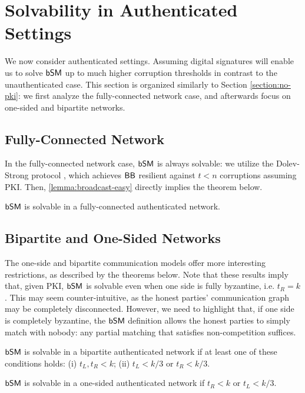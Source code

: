 \section{Solvability in Authenticated Settings}


We now consider authenticated settings. Assuming digital signatures will enable us to solve $\textsf{bSM}$ up to much higher corruption thresholds in contrast to the unauthenticated case. This section is organized similarly to Section \ref{section:no-pki}: we first analyze the fully-connected network case, and afterwards focus on one-sided and bipartite networks.

\subsection{Fully-Connected Network} 
In the fully-connected network case, $\textsf{bSM}$ is always solvable: we utilize the Dolev-Strong protocol \cite{DolStr83}, which achieves $\textsf{BB}$ resilient against $t < n$ corruptions assuming PKI. Then, \cref{lemma:broadcast-easy} directly implies the theorem below.
\begin{theorem}\label{theo:with-pki-complete}
$\textsf{bSM}$ is solvable in a fully-connected authenticated network.
\end{theorem}

\subsection{Bipartite and One-Sided Networks}\label{subsection:bipartite-pki}
The one-side and bipartite communication models offer more interesting restrictions, as described by the theorems below. 
Note that these results imply that, given PKI, $\textsf{bSM}$ is solvable even when one side is fully byzantine, i.e. $t_R = k$. This may seem counter-intuitive, as the honest parties' communication graph may be completely disconnected. However, we need to highlight that, if one side is completely byzantine, the $\textsf{bSM}$ definition allows the honest parties to simply match with nobody: any partial matching that satisfies non-competition suffices.
\begin{theorem} \label{thm:bipartite-pki-main}
$\textsf{bSM}$ is solvable in a bipartite authenticated network if at least one of these conditions holds: (i) $t_L, t_R < k$; (ii) $t_L < k/3$ or $t_R < k/3$.
\end{theorem}
\begin{theorem} \label{thm:one-sided-pki-main}
$\textsf{bSM}$ is solvable in a one-sided authenticated  network if $t_R < k$ or $t_L < k / 3$.
\end{theorem}


